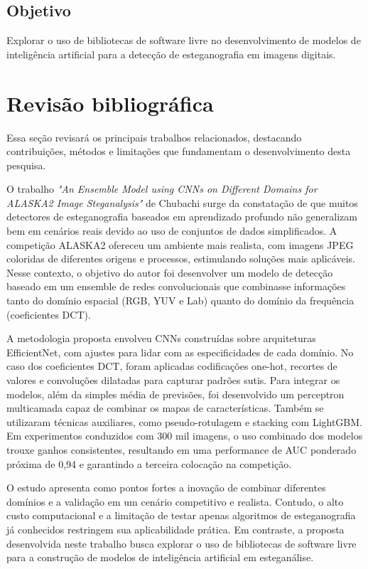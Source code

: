 \documentclass[12pt]{article}
\begin{document}
\subsection{Objetivo}

Explorar o uso de bibliotecas de software livre no desenvolvimento de modelos
de inteligência artificial para a detecção de esteganografia em imagens
digitais.

\section{Revisão bibliográfica} \label{sec:firstpage}
Essa seção revisará os principais trabalhos relacionados, destacando
contribuições, métodos e limitações que fundamentam o desenvolvimento desta
pesquisa.

O trabalho \textit{"An Ensemble Model using CNNs on Different Domains for
  ALASKA2 Image Steganalysis"} de Chubachi \cite{chubachi2020cnn} surge da
constatação de que muitos detectores de esteganografia baseados em aprendizado
profundo não generalizam bem em cenários reais devido ao uso de conjuntos de
dados simplificados. A competição ALASKA2 ofereceu um ambiente mais realista,
com imagens JPEG coloridas de diferentes origens e processos, estimulando
soluções mais aplicáveis. Nesse contexto, o objetivo do autor foi desenvolver
um modelo de detecção baseado em um ensemble de redes convolucionais que
combinasse informações tanto do domínio espacial (RGB, YUV e Lab) quanto do
domínio da frequência (coeficientes DCT).

A metodologia proposta envolveu CNNs construídas sobre arquiteturas
EfficientNet, com ajustes para lidar com as especificidades de cada domínio. No
caso dos coeficientes DCT, foram aplicadas codificações one-hot, recortes de
valores e convoluções dilatadas para capturar padrões sutis. Para integrar os
modelos, além da simples média de previsões, foi desenvolvido um perceptron
multicamada capaz de combinar os mapas de características. Também se utilizaram
técnicas auxiliares, como pseudo-rotulagem e stacking com LightGBM. Em
experimentos conduzidos com 300 mil imagens, o uso combinado dos modelos trouxe
ganhos consistentes, resultando em uma performance de AUC ponderado próxima de
0,94 e garantindo a terceira colocação na competição.

O estudo apresenta como pontos fortes a inovação de combinar diferentes
domínios e a validação em um cenário competitivo e realista. Contudo, o alto
custo computacional e a limitação de testar apenas algoritmos de esteganografia
já conhecidos restringem sua aplicabilidade prática. Em contraste, a proposta
desenvolvida neste trabalho busca explorar o uso de bibliotecas de software
livre para a construção de modelos de inteligência artificial em esteganálise.
\end{document}
